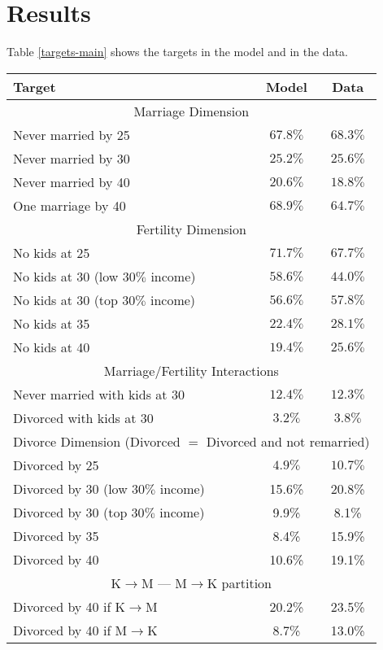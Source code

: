 \documentclass[12pt,letter]{article}
\begin{document}
\section{Results}
Table \ref{targets-main} shows the targets in the model and in the data.

\begin{table}
\begin{center}
\begin{tabular}{|l|c|c|}\hline
Target & Model & Data \\\hline
\multicolumn{3}{|c|}{Marriage Dimension} \\\hline
Never married by 25  & $67.8\%$ & $68.3\%$ \\
Never married by 30 & $25.2\%$ & $25.6\%$  \\
Never married by 40 & $20.6\%$ & $18.8\%$  \\\hline
One marriage by 40  & $68.9\%$ & $64.7\%$ \\\hline
\multicolumn{3}{|c|}{Fertility Dimension} \\\hline
No kids at 25 & $71.7\%$ & $67.7\%$ \\
No kids at 30 (low $30\%$ income) & $58.6\%$  &   $44.0\%$ \\
No kids at 30 (top $30\%$ income) & $56.6\%$  &   $57.8\%$ \\
No kids at 35  & $22.4\%$  &   $28.1\%$ \\
No kids at 40 & $19.4\%$ & $25.6\%$ \\\hline
\multicolumn{3}{|c|}{Marriage/Fertility Interactions} \\\hline
Never married with kids at 30 & $12.4\%$  & $12.3\%$ \\
Divorced with kids at 30 & $3.2\%$ & $3.8\%$ \\\hline
\multicolumn{3}{|c|}{Divorce Dimension (Divorced $=$ Divorced and not remarried)} \\\hline
Divorced by 25 & $4.9\%$   & $10.7\%$ \\
Divorced by 30 (low $30\%$ income)  & 15.6\% &     20.8\% \\
Divorced by 30 (top $30\%$ income)  & 9.9\% &     8.1\% \\
Divorced by 35  & 8.4\% &    15.9\% \\
Divorced by 40  & 10.6\% &    19.1\% \\\hline
\multicolumn{3}{|c|}{K$\to$M --- M$\to$K partition} \\\hline
Divorced by 40 if K$\to$M & 20.2\% &   23.5\% \\
Divorced by 40 if M$\to$K & 8.7\% &      13.0\% \\

\end{tabular}
\end{center}
\end{table}
\end{document}
